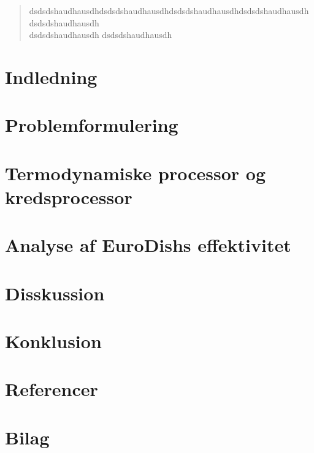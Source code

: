 \documentclass[12pt,a4paper]{article}
\author{Christian Kaae Larsen}
\begin{document}
	
	
	
	
	\newpage
	
	\tableofcontents
	
	\newpage
	
	\begin{abstract}
		dsdsdshaudhausdhdsdsdshaudhausdhdsdsdshaudhausdhdsdsdshaudhausdh
		dsdsdshaudhausdh\\
		dsdsdshaudhausdh
		dsdsdshaudhausdh
	\end{abstract}
	
	\section{Indledning}
	

	\section{Problemformulering}
	
	
	
	\section{Termodynamiske processor og kredsprocessor}
	
	
	\section{Analyse af EuroDishs effektivitet}
	
	
	\section{Disskussion}
	
	
	\section{Konklusion}
	
	
	\section{Referencer}
	
		
	\newpage
		
	\section{Bilag}
	
	
	
	
			
			
			
			
			
			
\end{document}
